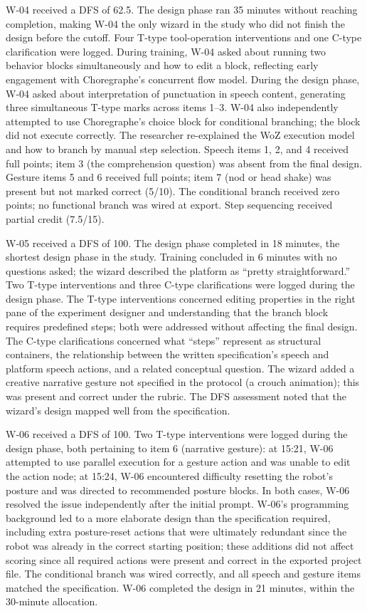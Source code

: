 W-04 received a DFS of 62.5. The design phase ran 35 minutes without reaching completion, making W-04 the only wizard in the study who did not finish the design before the cutoff. Four T-type tool-operation interventions and one C-type clarification were logged. During training, W-04 asked about running two behavior blocks simultaneously and how to edit a block, reflecting early engagement with Choregraphe's concurrent flow model. During the design phase, W-04 asked about interpretation of punctuation in speech content, generating three simultaneous T-type marks across items 1--3. W-04 also independently attempted to use Choregraphe's choice block for conditional branching; the block did not execute correctly. The researcher re-explained the WoZ execution model and how to branch by manual step selection. Speech items 1, 2, and 4 received full points; item 3 (the comprehension question) was absent from the final design. Gesture items 5 and 6 received full points; item 7 (nod or head shake) was present but not marked correct (5/10). The conditional branch received zero points; no functional branch was wired at export. Step sequencing received partial credit (7.5/15).

W-05 received a DFS of 100. The design phase completed in 18 minutes, the shortest design phase in the study. Training concluded in 6 minutes with no questions asked; the wizard described the platform as ``pretty straightforward.'' Two T-type interventions and three C-type clarifications were logged during the design phase. The T-type interventions concerned editing properties in the right pane of the experiment designer and understanding that the branch block requires predefined steps; both were addressed without affecting the final design. The C-type clarifications concerned what ``steps'' represent as structural containers, the relationship between the written specification's speech and platform speech actions, and a related conceptual question. The wizard added a creative narrative gesture not specified in the protocol (a crouch animation); this was present and correct under the rubric. The DFS assessment noted that the wizard's design mapped well from the specification.

W-06 received a DFS of 100. Two T-type interventions were logged during the design phase, both pertaining to item 6 (narrative gesture): at 15:21, W-06 attempted to use parallel execution for a gesture action and was unable to edit the action node; at 15:24, W-06 encountered difficulty resetting the robot's posture and was directed to recommended posture blocks. In both cases, W-06 resolved the issue independently after the initial prompt. W-06's programming background led to a more elaborate design than the specification required, including extra posture-reset actions that were ultimately redundant since the robot was already in the correct starting position; these additions did not affect scoring since all required actions were present and correct in the exported project file. The conditional branch was wired correctly, and all speech and gesture items matched the specification. W-06 completed the design in 21 minutes, within the 30-minute allocation.

